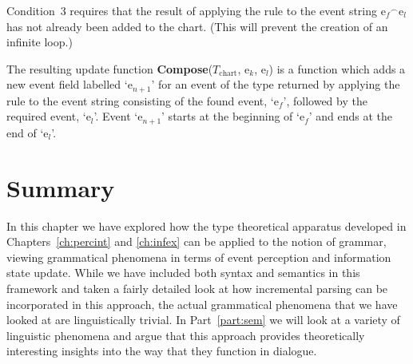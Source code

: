 Condition~3 requires that the result of applying the rule to the event
string {e$_f$}$^{\frown}$e$_l$ has not already been added to the
chart.  (This will prevent the creation of an infinite loop.)

The resulting update function \textbf{Compose}($T_{\mathrm{chart}}$,
e$_k$, e$_l$) is a function which adds a new event field labelled
`e$_{n+1}$' for an event of the type returned by applying the rule to
the event string consisting of the found event, `e$_f$', followed by the
required event, `e$_l$'.  Event `e$_{n+1}$' starts at the beginning of
`e$_f$' and ends at the end of `e$_l$'.    
 
  
\section{Summary}

In this chapter we have explored how the type theoretical apparatus
developed in Chapters~\ref{ch:percint} and \ref{ch:infex} can be
applied to the notion of grammar, viewing grammatical phenomena in
terms of event perception and information state update.  While we have
included both syntax and semantics in this framework and taken a
fairly detailed look at how incremental parsing can be incorporated in
this approach, the actual grammatical phenomena that we have looked at
are linguistically trivial. In Part~\ref{part:sem} we will look at
a variety of linguistic phenomena and argue that this approach
provides theoretically interesting insights into the way that they
function in dialogue.


